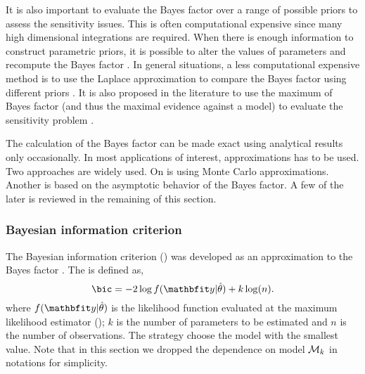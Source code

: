 It is also important to evaluate the Bayes factor over a range of possible
priors to assess the sensitivity issues. This is often computational expensive
since many high dimensional integrations are required. When there is enough
information to construct parametric priors, it is possible to alter the values
of parameters and recompute the Bayes factor \cite{McCulloch:1991hj}. In
general situations, a less computational expensive method is to use the
Laplace approximation to compare the Bayes factor using different priors
\cite{Kass:1992tz}. It is also proposed in the literature to use the maximum
of Bayes factor (and thus the maximal evidence against a model) to evaluate
the sensitivity problem \cite{Berger:1987iq}.

The calculation of the Bayes factor can be made exact using analytical results
only occasionally. In most applications of interest, approximations has to be
used. Two approaches are widely used. On is using Monte Carlo approximations.
Another is based on the asymptotic behavior of the Bayes factor. A few of the
later is reviewed in the remaining of this section.

\subsubsection{Bayesian information criterion}
\label{ssub:Bayesian information criterion}

The Bayesian information criterion (\bic) was developed as an approximation to
the Bayes factor \cite{Schwarz:1978uv}. The \bic is defined as,
\begin{equation}
  \text{\bic} = -2\log f(\data|\hat\theta) + k\log(n).
\end{equation}
where $f(\data|\hat\theta)$ is the likelihood function evaluated at the
maximum likelihood estimator (\mle); $k$ is the number of parameters to be
estimated and $n$ is the number of observations. The \bic strategy choose the
model with the smallest \bic value. Note that in this section we dropped the
dependence on model $\mathcal{M}_k$ in notations for simplicity.

